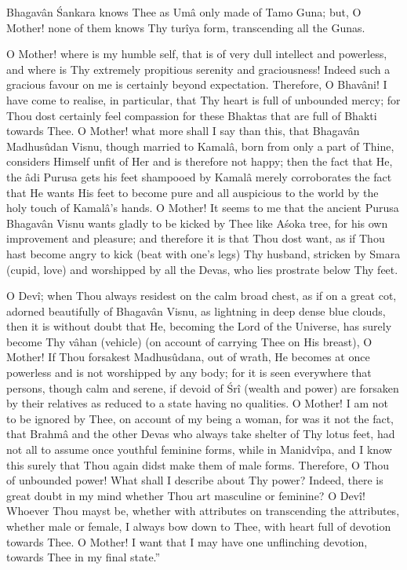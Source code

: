 Bhagav\^an \'Sankara knows Thee as Um\^a only made of Tamo Guna; but, O Mother! none of them knows Thy tur\^iya form, transcending all the Gunas.

O Mother! where is my humble self, that is of very dull intellect and powerless, and where is Thy extremely propitious serenity and graciousness! Indeed such a gracious favour on me is certainly beyond expectation. Therefore, O Bhav\^ani! I have come to realise, in particular, that Thy heart is full of unbounded mercy; for Thou dost certainly feel compassion for these Bhaktas that are full of Bhakti towards Thee. O Mother! what more shall I say than this, that Bhagav\^an Madhus\^udan Visnu, though married to Kamal\^a, born from only a part of Thine, considers Himself unfit of Her and is therefore not happy; then the fact that He, the \^adi Purusa gets his feet shampooed by Kamal\^a merely corroborates the fact that He wants His feet to become pure and all auspicious to the world by the holy touch of Kamal\^a's hands. O Mother! It seems to me that the ancient Purusa Bhagav\^an Visnu wants gladly to be kicked by Thee like A\'soka tree, for his own improvement and pleasure; and therefore it is that Thou dost want, as if Thou hast become angry to kick (beat with one's legs) Thy husband, stricken by Smara (cupid, love) and worshipped by all the Devas, who lies prostrate below Thy feet.

O Dev\^i; when Thou always residest on the calm broad chest, as if on a great cot, adorned beautifully of Bhagav\^an Visnu, as lightning in deep dense blue clouds, then it is without doubt that He, becoming the Lord of the Universe, has surely become Thy v\^ahan (vehicle) (on account of carrying Thee on His breast), O Mother! If Thou forsakest Madhus\^udana, out of wrath, He becomes at once powerless and is not worshipped by any body; for it is seen everywhere that persons, though calm and serene, if devoid of \'Sr\^i (wealth and power) are forsaken by their relatives as reduced to a state having no qualities. O Mother! I am not to be ignored by Thee, on account of my being a woman, for was it not the fact, that Brahm\^a and the other Devas who always take shelter of Thy lotus feet, had not all to assume once youthful feminine forms, while in Manidv\^ipa, and I know this surely that Thou again didst make them of male forms. Therefore, O Thou of unbounded power! What shall I describe about Thy power? Indeed, there is great doubt in my mind whether Thou art masculine or feminine? O Dev\^i! Whoever Thou mayst be, whether with attributes on transcending the attributes, whether male or female, I always bow down to Thee, with heart full of devotion towards Thee. O Mother! I want that I may have one unflinching devotion, towards Thee in my final state.''

